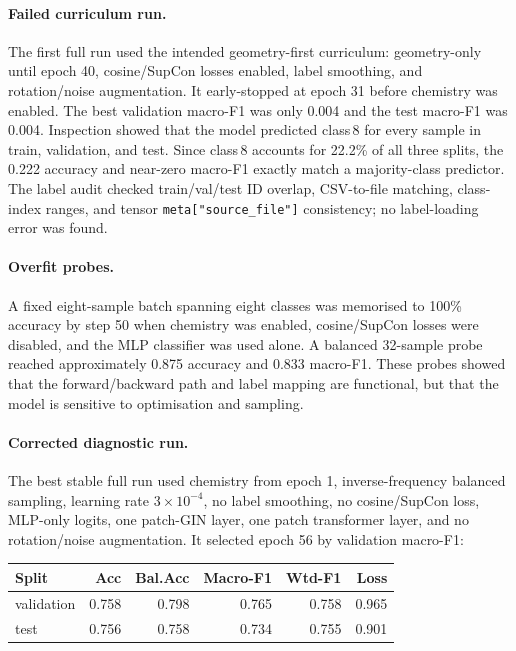 \paragraph{Failed curriculum run.}
The first full run used the intended geometry-first curriculum:
geometry-only until epoch 40, cosine/SupCon losses enabled, label smoothing,
and rotation/noise augmentation.
It early-stopped at epoch 31 before chemistry was enabled.
The best validation macro-F1 was only 0.004 and the test macro-F1 was 0.004.
Inspection showed that the model predicted class\,8 for every sample in train,
validation, and test.
Since class\,8 accounts for 22.2\% of all three splits, the 0.222 accuracy and
near-zero macro-F1 exactly match a majority-class predictor.
The label audit checked train/val/test ID overlap, CSV-to-file matching,
class-index ranges, and tensor \texttt{meta["source\_file"]} consistency; no
label-loading error was found.

\paragraph{Overfit probes.}
A fixed eight-sample batch spanning eight classes was memorised to 100\%
accuracy by step 50 when chemistry was enabled, cosine/SupCon losses were
disabled, and the MLP classifier was used alone.
A balanced 32-sample probe reached approximately 0.875 accuracy and 0.833
macro-F1.
These probes showed that the forward/backward path and label mapping are
functional, but that the model is sensitive to optimisation and sampling.

\paragraph{Corrected diagnostic run.}
The best stable full run used chemistry from epoch 1, inverse-frequency
balanced sampling, learning rate $3\times10^{-4}$, no label smoothing,
no cosine/SupCon loss, MLP-only logits, one patch-GIN layer, one patch
transformer layer, and no rotation/noise augmentation.
It selected epoch 56 by validation macro-F1:

\begin{center}
\begin{tabular}{lrrrrr}
  \toprule
  \textbf{Split} & \textbf{Acc} & \textbf{Bal.Acc} & \textbf{Macro-F1} & \textbf{Wtd-F1} & \textbf{Loss} \\
  \midrule
  validation & 0.758 & 0.798 & 0.765 & 0.758 & 0.965 \\
  test       & 0.756 & 0.758 & 0.734 & 0.755 & 0.901 \\
  \bottomrule
\end{tabular}
\end{center}

